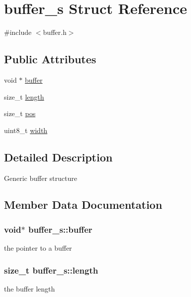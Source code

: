 \hypertarget{structbuffer__s}{}\section{buffer\+\_\+s Struct Reference}
\label{structbuffer__s}


{\ttfamily \#include $<$buffer.\+h$>$}

\subsection*{Public Attributes}
\begin{DoxyCompactItemize}
\item 
void $\ast$ \hyperlink{structbuffer__s_a46617a468d56010fa39f86d2255ecbb0}{buffer}
\item 
size\+\_\+t \hyperlink{structbuffer__s_a9c569d61ba0dcc0338bf3c9625f18231}{length}
\item 
size\+\_\+t \hyperlink{structbuffer__s_a7b83c0750f3dc1aa729e2bafaaef3851}{pos}
\item 
uint8\+\_\+t \hyperlink{structbuffer__s_ade001f85e94113a6781eb6e09731bf09}{width}
\end{DoxyCompactItemize}


\subsection{Detailed Description}
Generic buffer structure 

\subsection{Member Data Documentation}
\subsubsection[{\texorpdfstring{buffer}{buffer}}]{\setlength{\rightskip}{0pt plus 5cm}void$\ast$ buffer\+\_\+s\+::buffer}\hypertarget{structbuffer__s_a46617a468d56010fa39f86d2255ecbb0}{}\label{structbuffer__s_a46617a468d56010fa39f86d2255ecbb0}
the pointer to a buffer 
\subsubsection[{\texorpdfstring{length}{length}}]{\setlength{\rightskip}{0pt plus 5cm}size\+\_\+t buffer\+\_\+s\+::length}\hypertarget{structbuffer__s_a9c569d61ba0dcc0338bf3c9625f18231}{}\label{structbuffer__s_a9c569d61ba0dcc0338bf3c9625f18231}
the buffer length 
